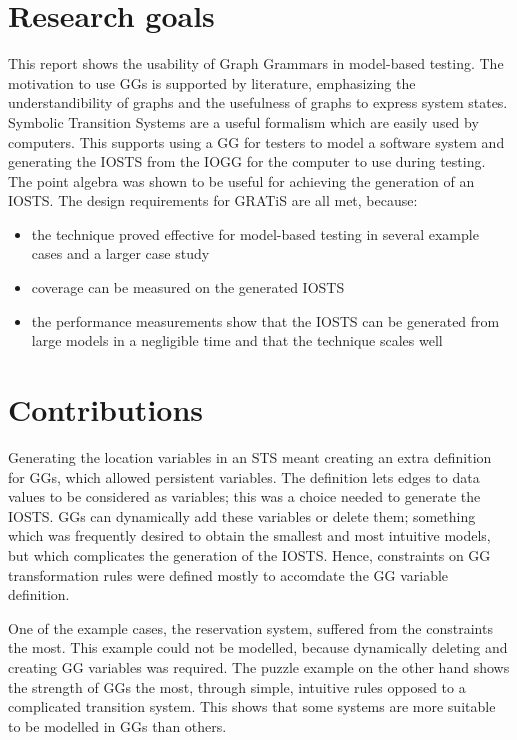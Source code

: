 \section{Research goals}
This report shows the usability of Graph Grammars in model-based testing. The motivation to use GGs is supported by literature, emphasizing the understandibility of graphs and the usefulness of graphs to express system states. Symbolic Transition Systems are a useful formalism which are easily used by computers. This supports using a GG for testers to model a software system and generating the IOSTS from the IOGG for the computer to use during testing. 
The point algebra was shown to be useful for achieving the generation of an IOSTS. The design requirements for GRATiS are all met, because:
\begin{itemize} 
\item the technique proved effective for model-based testing in several example cases and a larger case study
\item coverage can be measured on the generated IOSTS
\item the performance measurements show that the IOSTS can be generated from large models in a negligible time and that the technique scales well
\end{itemize}

\section{Contributions}
Generating the location variables in an STS meant creating an extra definition for GGs, which allowed persistent variables. The definition lets edges to data values to be considered as variables; this was a choice needed to generate the IOSTS. GGs can dynamically add these variables or delete them; something which was frequently desired to obtain the smallest and most intuitive models, but which complicates the generation of the IOSTS. Hence, constraints on GG transformation rules were defined mostly to accomdate the GG variable definition.

One of the example cases, the reservation system, suffered from the constraints the most. This example could not be modelled, because dynamically deleting and creating GG variables was required. The puzzle example on the other hand shows the strength of GGs the most, through simple, intuitive rules opposed to a complicated transition system. This shows that some systems are more suitable to be modelled in GGs than others.

